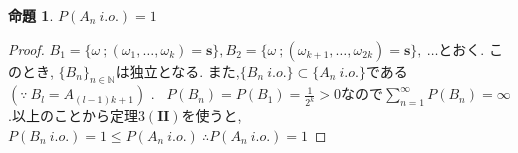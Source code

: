 \documentclass{jsarticle}
\newtheorem{prop}[thm]{命題}
\begin{document}
\begin{prop}
$P(A_{n} \ i.o.) = 1$
\end{prop}
\begin{proof}
$B_{1} = \lbrace \omega \ ; (\omega_{1},\dots,\omega_{k}) = \textbf {s}  \rbrace , B_{2} = \lbrace \omega \ ; (\omega_{k+1},\dots,\omega_{2k}) = \textbf {s}  \rbrace , \ \dots$とおく. このとき, ${\lbrace B_{n} \rbrace}_{n \in \mathbb{N}}$は独立となる. また,$\lbrace B_{n} \ i.o. \rbrace \subset \lbrace A_{n} \ i.o.\rbrace$である$( \because \ B_{l} = A_{(l-1)k + 1})$ . \ $P(B_{n}) = P(B_{1}) = \frac{1}{2^{k}} > 0$なので$\displaystyle\sum_{n=1}^{\infty}P(B_{n}) = \infty$.以上のことから定理3$(\textbf{II})$を使うと, $P(B_{n} \ i.o.) = 1 \le P(A_{n} \ i.o.) \ \therefore P(A_{n} \ i.o.)=1$
\end{proof}
\end{document}
